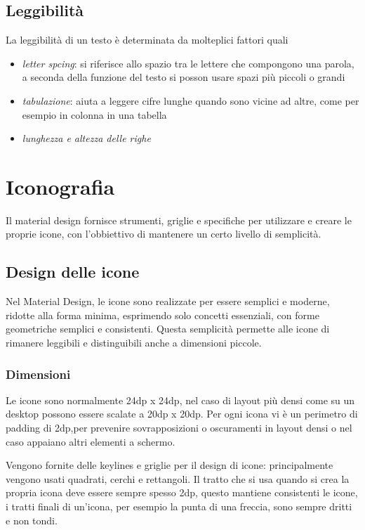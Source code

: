 \documentclass[12pt, a4paper]{report}
\begin{document}
	\subsection{Leggibilità}
	La leggibilità di un testo è determinata da molteplici fattori quali
	\begin{itemize}
		\item \textit{letter spcing}: si riferisce allo spazio tra le lettere che compongono una parola, a seconda della funzione del testo si posson usare spazi più piccoli o grandi
		\item \textit{tabulazione}: aiuta a leggere cifre lunghe quando sono vicine ad altre, come per esempio in colonna in una tabella
		\item \textit{lunghezza e altezza delle righe}
	\end{itemize}




	\section{Iconografia}
		Il material design fornisce strumenti, griglie e specifiche per utilizzare e creare le proprie icone, con l'obbiettivo di mantenere un certo livello di semplicità.
		\subsection{Design delle icone}
			Nel Material Design, le icone sono realizzate per essere semplici e moderne, ridotte alla forma minima, esprimendo solo concetti essenziali, con forme geometriche semplici e consistenti. Questa semplicità permette alle icone di rimanere leggibili e distinguibili anche a dimensioni piccole.
			
			\subsubsection{Dimensioni}
			Le icone sono normalmente 24dp x 24dp, nel caso di layout più densi come su un desktop possono essere scalate a 20dp x 20dp.
			Per ogni icona vi è un perimetro di padding di 2dp,per prevenire sovrapposizioni o oscuramenti in layout densi o nel caso appaiano altri elementi a schermo.

			Vengono fornite delle keylines e griglie per il design di icone: principalmente vengono usati quadrati, cerchi e rettangoli.
			Il tratto che si usa quando si crea la propria icona deve essere sempre spesso 2dp, questo mantiene consistenti le icone, i tratti finali di un'icona, per esempio la punta di una freccia, sono sempre dritti e non tondi.
			
\end{document}
